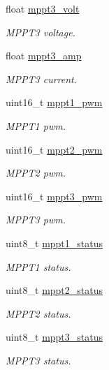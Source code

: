 \begin{DoxyCompactItemize}
float \hyperlink{struct____mavlink__sens__mppt__t_a67ffaddda7c7e525147eb34fa217015f}{mppt3\+\_\+volt}
\begin{DoxyCompactList}\small\item\em M\+P\+P\+T3 voltage. \end{DoxyCompactList}\item 
float \hyperlink{struct____mavlink__sens__mppt__t_ad64ec394e302da8fc6628828a8567940}{mppt3\+\_\+amp}
\begin{DoxyCompactList}\small\item\em M\+P\+P\+T3 current. \end{DoxyCompactList}\item 
uint16\+\_\+t \hyperlink{struct____mavlink__sens__mppt__t_a5d79825d3b124b2579802060423d0dcf}{mppt1\+\_\+pwm}
\begin{DoxyCompactList}\small\item\em M\+P\+P\+T1 pwm. \end{DoxyCompactList}\item 
uint16\+\_\+t \hyperlink{struct____mavlink__sens__mppt__t_a20df9374ec73332c9ea3586303a01e1a}{mppt2\+\_\+pwm}
\begin{DoxyCompactList}\small\item\em M\+P\+P\+T2 pwm. \end{DoxyCompactList}\item 
uint16\+\_\+t \hyperlink{struct____mavlink__sens__mppt__t_af8a9640faa7b507146a0c97c6cde61ff}{mppt3\+\_\+pwm}
\begin{DoxyCompactList}\small\item\em M\+P\+P\+T3 pwm. \end{DoxyCompactList}\item 
uint8\+\_\+t \hyperlink{struct____mavlink__sens__mppt__t_a862f3e5acf65184cb7902c3546760c61}{mppt1\+\_\+status}
\begin{DoxyCompactList}\small\item\em M\+P\+P\+T1 status. \end{DoxyCompactList}\item 
uint8\+\_\+t \hyperlink{struct____mavlink__sens__mppt__t_ac080a6f7d87e048d2feef4e681dd3e58}{mppt2\+\_\+status}
\begin{DoxyCompactList}\small\item\em M\+P\+P\+T2 status. \end{DoxyCompactList}\item 
uint8\+\_\+t \hyperlink{struct____mavlink__sens__mppt__t_a2a1a35889eeeb05a15a50478a0e41324}{mppt3\+\_\+status}
\begin{DoxyCompactList}\small\item\em M\+P\+P\+T3 status. \end{DoxyCompactList}\end{DoxyCompactItemize}


